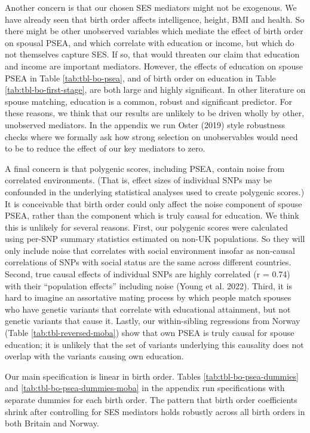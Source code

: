 \documentclass[
  12pt,
]{article}
\theoremstyle{definition}
\theoremstyle{definition}
\theoremstyle{definition}
\theoremstyle{definition}
\theoremstyle{remark}
\begin{document}
Another concern is that our chosen SES mediators might not be exogenous.
We have already seen that birth order affects intelligence, height, BMI
and health. So there might be other unobserved variables which mediate
the effect of birth order on spousal PSEA, and which correlate with
education or income, but which do not themselves capture SES. If so,
that would threaten our claim that education and income are important
mediators. However, the effects of education on spouse PSEA in Table
\ref{tab:tbl-bo-psea}, and of birth order on education in Table
\ref{tab:tbl-bo-first-stage}, are both large and highly significant. In
other literature on spouse matching, education is a common, robust and
significant predictor. For these reasons, we think that our results are
unlikely to be driven wholly by other, unobserved mediators. In the
appendix we run Oster (2019) style robustness checks where we
formally ask how strong selection on unobservables would need to be to
reduce the effect of our key mediators to zero.

A final concern is that polygenic scores, including PSEA, contain noise
from correlated environments. (That is, effect sizes of individual SNPs
may be confounded in the underlying statistical analyses used to create
polygenic scores.) It is conceivable that birth order could only affect
the noise component of spouse PSEA, rather than the component which is
truly causal for education. We think this is unlikely for several
reasons. First, our polygenic scores were calculated using per-SNP
summary statistics estimated on non-UK populations. So they will only
include noise that correlates with social environment insofar as
non-causal correlations of SNPs with social status are the same across
different countries. Second, true causal effects of individual SNPs are
highly correlated (r = 0.74) with their ``population effects'' including
noise (Young et al. 2022). Third, it is hard to imagine an assortative
mating process by which people match spouses who have genetic variants
that correlate with educational attainment, but not genetic variants
that cause it. Lastly, our within-sibling regressions from Norway (Table
\ref{tab:tbl-reversed-moba}) show that own PSEA is truly causal for
spouse education; it is unlikely that the set of variants underlying
this causality does not overlap with the variants causing own education.

Our main specification is linear in birth order. Tables
\ref{tab:tbl-bo-psea-dummies} and \ref{tab:tbl-bo-psea-dummies-moba}
in the appendix run specifications with separate dummies for each birth
order. The pattern that birth order coefficients shrink after
controlling for SES mediators holds robustly across all birth orders in
both Britain and Norway.
\end{document}
